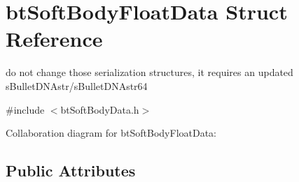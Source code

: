 \hypertarget{structbt_soft_body_float_data}{\section{bt\+Soft\+Body\+Float\+Data Struct Reference}
\label{structbt_soft_body_float_data}
}


do not change those serialization structures, it requires an updated s\+Bullet\+D\+N\+Astr/s\+Bullet\+D\+N\+Astr64  




{\ttfamily \#include $<$bt\+Soft\+Body\+Data.\+h$>$}



Collaboration diagram for bt\+Soft\+Body\+Float\+Data\+:
\subsection*{Public Attributes}
